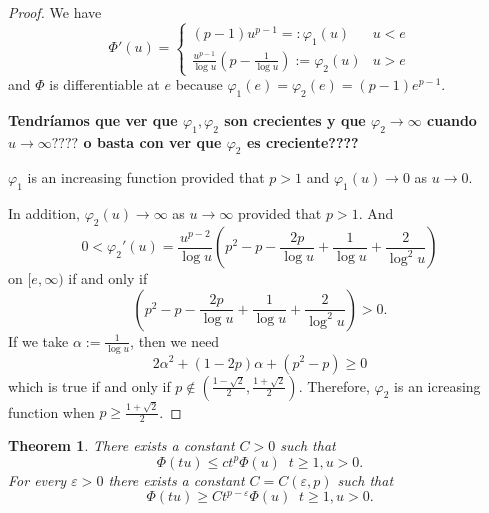 \documentclass[twoside]{article}
\newtheorem{thm}{Theorem}[section]
\theoremstyle{remark}
\renewcommand{\leq}{\leqslant}
\begin{document}
\begin{proof}
We have 
\[\Phi'(u)=\left\{
\begin{array}{cl}
(p-1)u^{p-1}=:\varphi_1(u)&u<e
\\
\frac{u^{p-1}}{\log u}(p-\frac{1}{\log u}):=\varphi_2(u)&u>e
\end{array}
\right.
\]
and $\Phi$ is differentiable at $e$ because $\varphi_1(e)=\varphi_2(e)=(p-1)e^{p-1}$.

{\bf Tendr\'iamos que ver que $\varphi_1,\varphi_2$ son crecientes y que $\varphi_2\to \infty$ cuando
$u \to \infty????$ o basta con ver que $\varphi_2$ es creciente????}

$\varphi_1$ is an increasing function provided that $p>1$ and $\varphi_1(u)\to 0$ as $u \to 0$.

In addition, $\varphi_2(u)\to \infty$ as $u \to \infty$ provided that $p>1$.
And 
\[0<\varphi_2'(u)=
\frac{u^{p-2}}{\log u} \left(p^2-p-\frac{2p}{\log u}+\frac{1}{\log u}+\frac{2}{\log^2 u}\right)\] on $[e,\infty)$ if and only if 
\[
\left(p^2-p-\frac{2p}{\log u}+\frac{1}{\log u}+\frac{2}{\log^2 u}\right)>0.
\]
If we take $\alpha:=\frac{1}{\log u}$, then we need 
\[
2\alpha^2+(1-2p)\alpha+(p^2-p)\geq 0
\]
which is true if and only if $p \notin(\frac{1-\sqrt2}{2},\frac{1+\sqrt2}{2})$.
Therefore, $\varphi_2$ is an icreasing function when $p\geq \frac{1+\sqrt2}{2}$.
\end{proof}



\begin{thm}
There exists a constant $C>0$ such that 
\begin{equation}\label{cota-sup-indices}
\Phi(tu)\leq ct^p\Phi(u)\;\;t\geq 1, u>0.
\end{equation}
For every $\varepsilon>0$ there exists a constant $C=C(\varepsilon,p)$ such that
\begin{equation}\label{cota-inf-indices}
\Phi(tu)\geq Ct^{p-\varepsilon}\Phi(u)\;\;t\geq 1,u>0.
\end{equation}
\end{thm}
\end{document}
